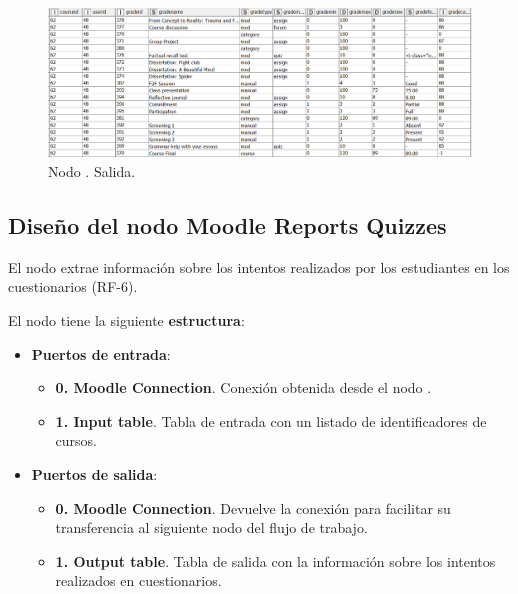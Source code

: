 \begin{figure}[!h]
	\centering
	\includegraphics[width=1\textwidth]{img/nodes_moodle_reports_grades_output.png}
	\caption{Nodo . Salida.}
	\label{fig:moodlereportsgrades_output}
\end{figure}
\FloatBarrier
\hphantom{ }


\newpage
\subsection{Diseño del nodo Moodle Reports Quizzes}

El nodo  extrae información sobre los intentos realizados por los estudiantes en los cuestionarios (RF-6). 
\

El nodo tiene la siguiente \textbf{estructura}:

\begin{itemize}
	\item \textbf{Puertos de entrada}: 
    \begin{itemize}
		\item \textbf{0. Moodle Connection}. Conexión obtenida desde el nodo . 
		\item \textbf{1. Input table}. Tabla de entrada con un listado de identificadores de cursos. 
   	\end{itemize}

	\item \textbf{Puertos de salida}: 
    \begin{itemize}
		\item \textbf{0. Moodle Connection}. Devuelve la conexión para facilitar su transferencia al siguiente nodo del flujo de trabajo. 
		\item \textbf{1. Output table}. Tabla de salida con la información sobre los intentos realizados en cuestionarios. 
   	\end{itemize}

\end{itemize}



